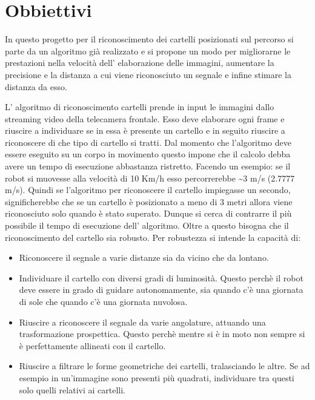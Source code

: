 \section{Obbiettivi}

	In questo progetto per il riconoscimento dei cartelli posizionati sul percorso si parte da un algoritmo già realizzato e si propone un modo per migliorarne le prestazioni nella velocità dell' elaborazione delle immagini, aumentare la precisione e la distanza a cui viene riconosciuto un segnale e infine stimare la distanza da esso.
	
	L' algoritmo di riconoscimento cartelli prende in input le immagini dallo streaming video della telecamera frontale. Esso deve elaborare ogni frame e riuscire a individuare se in essa è presente un cartello e in seguito riuscire a riconoscere di che tipo di cartello si tratti. Dal momento che l'algoritmo deve essere eseguito su un corpo in movimento questo impone che il calcolo debba avere un tempo di esecuzione abbastanza ristretto. Facendo un esempio: se il robot si muovesse alla velocità di 10 Km/h esso percorrerebbe \textasciitilde $3$ m/s (2.7777 m/s). Quindi se l'algoritmo per riconoscere il cartello impiegasse un secondo, significherebbe che se un cartello è posizionato a meno di 3 metri allora viene riconosciuto solo quando è stato superato. Dunque si cerca di contrarre il più possibile il tempo di esecuzione dell' algoritmo. Oltre a questo bisogna che il riconoscimento del cartello sia robusto. Per robustezza si intende la capacità di:
	\begin{itemize}
		\item Riconoscere il segnale a varie distanze sia da vicino che da lontano.
		\item Individuare il cartello con diversi gradi di luminosità. Questo perchè il robot deve essere in grado di guidare autonomamente, sia quando c'è una giornata di sole che quando c'è una giornata nuvolosa.
		\item Riuscire a riconoscere il segnale da varie angolature, attuando una trasformazione prospettica. Questo perchè mentre si è in moto non sempre si è perfettamente allineati con il cartello. 
		\item Riuscire a filtrare le forme geometriche dei cartelli, tralasciando le altre. Se ad esempio in un'immagine sono presenti più quadrati, individuare tra questi solo quelli relativi ai cartelli.
	\end{itemize}

